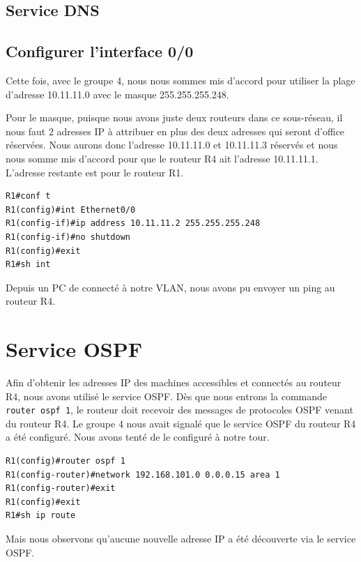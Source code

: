 \documentclass[a4paper,10pt]{article}
\begin{document}
\subsection{Service DNS}

\subsection{Configurer l'interface 0/0}
Cette fois, avec le groupe 4, nous nous sommes mis d'accord pour utiliser la plage d'adresse 10.11.11.0 avec le masque 255.255.255.248.

Pour le masque, puisque nous avons juste deux routeurs dans ce sous-réseau, il nous faut 2 adresses IP à attribuer en plus des deux adresses qui seront d'office réservées.
Nous aurons donc l'adresse 10.11.11.0 et 10.11.11.3 réservés et nous nous somme mis d'accord pour que le routeur R4 ait l'adresse 10.11.11.1.
L'adresse restante est pour le routeur R1.
\begin{verbatim}
R1#conf t
R1(config)#int Ethernet0/0
R1(config-if)#ip address 10.11.11.2 255.255.255.248
R1(config-if)#no shutdown
R1(config)#exit
R1#sh int
\end{verbatim}
Depuis un PC de connecté à notre VLAN, nous avons pu envoyer un ping au routeur R4.

\section{Service OSPF}
Afin d'obtenir les adresses IP des machines accessibles et connectés au routeur R4, nous avons utilisé le service OSPF.
Dès que nous entrons la commande \texttt{router ospf 1}, le routeur doit recevoir des messages de protocoles OSPF venant du routeur R4.
Le groupe 4 nous avait signalé que le service OSPF du routeur R4 a été configuré. Nous avons tenté de le configuré à notre tour.
\begin{verbatim}
R1(config)#router ospf 1
R1(config-router)#network 192.168.101.0 0.0.0.15 area 1
R1(config-router)#exit
R1(config)#exit
R1#sh ip route
\end{verbatim}
Mais nous observons qu'aucune nouvelle adresse IP a été découverte via le service OSPF.
\end{document}
